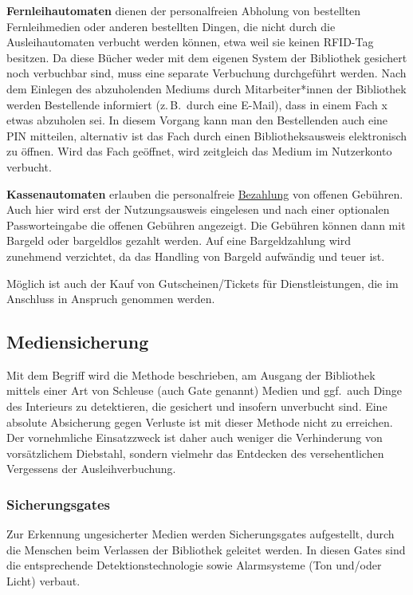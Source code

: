 \documentclass[
  11pt,
  letterpaper,
  DIV=11,
  twoside]{scrreprt}
\begin{document}
\textbf{Fernleihautomaten} dienen der personalfreien Abholung von
bestellten Fernleihmedien oder anderen bestellten Dingen, die nicht
durch die Ausleihautomaten verbucht werden können, etwa weil sie keinen
RFID-Tag besitzen. Da diese Bücher weder mit dem eigenen System der
Bibliothek gesichert noch verbuchbar sind, muss eine separate Verbuchung
durchgeführt werden. Nach dem Einlegen des abzuholenden Mediums durch
Mitarbeiter*innen der Bibliothek werden Bestellende informiert
(z.\,B.~durch eine E-Mail), dass in einem Fach x etwas abzuholen sei. In
diesem Vorgang kann man den Bestellenden auch eine PIN mitteilen,
alternativ ist das Fach durch einen Bibliotheksausweis elektronisch zu
öffnen. Wird das Fach geöffnet, wird zeitgleich das Medium im
Nutzerkonto verbucht.

\textbf{Kassenautomaten} erlauben die personalfreie
\hyperref[bezahlung]{Bezahlung} von offenen Gebühren. Auch hier wird
erst der Nutzungsausweis eingelesen und nach einer optionalen
Passworteingabe die offenen Gebühren angezeigt. Die Gebühren können dann
mit Bargeld oder bargeldlos gezahlt werden. Auf eine Bargeldzahlung wird
zunehmend verzichtet, da das Handling von Bargeld aufwändig und teuer
ist.

Möglich ist auch der Kauf von Gutscheinen/Tickets für Dienstleistungen,
die im Anschluss in Anspruch genommen werden.

\subsection{Mediensicherung}\label{mediensicherung}

Mit dem Begriff wird die Methode beschrieben, am Ausgang der Bibliothek
mittels einer Art von Schleuse (auch Gate genannt) Medien und ggf.~auch
Dinge des Interieurs zu detektieren, die gesichert und insofern
unverbucht sind. Eine absolute Absicherung gegen Verluste ist mit dieser
Methode nicht zu erreichen. Der vornehmliche Einsatzzweck ist daher auch
weniger die Verhinderung von vorsätzlichem Diebstahl, sondern vielmehr
das Entdecken des versehentlichen Vergessens der Ausleihverbuchung.

\subsubsection{Sicherungsgates}\label{sicherungsgates}

Zur Erkennung ungesicherter Medien werden Sicherungsgates aufgestellt,
durch die Menschen beim Verlassen der Bibliothek geleitet werden. In
diesen Gates sind die entsprechende Detektionstechnologie sowie
Alarmsysteme (Ton und/oder Licht) verbaut.
\end{document}
